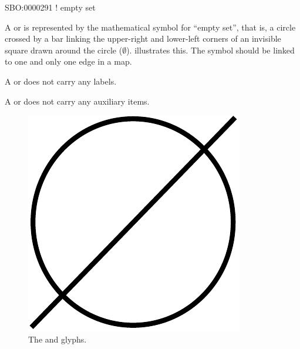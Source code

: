 \begin{glyphDescription}

\glyphSboTerm SBO:0000291 ! empty set

\glyphContainer A  or  is represented by the mathematical symbol for ``empty
set'', that is, a circle crossed by a bar linking the upper-right and
lower-left corners of an invisible square drawn around the circle ($\emptyset$).
 illustrates this.  The symbol should be linked to one
and only one edge in a map.

\glyphLabel A  or  does not carry any labels.

\glyphAux A  or  does not carry any auxiliary items.  

\end{glyphDescription}

\begin{figure}[H]
  \centering
  \includegraphics[scale = 0.3]{images/sourceSink}
  \caption{The  and  glyphs.}
  \label{fig:sourceSink}
\end{figure}






